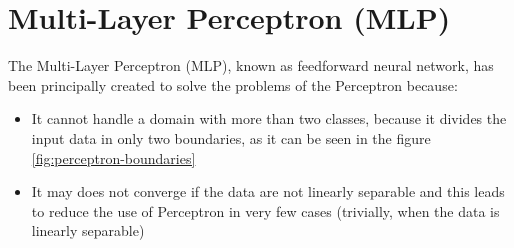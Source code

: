 \section{Multi-Layer Perceptron (MLP)}
The Multi-Layer Perceptron (MLP), known as feedforward neural network, has been principally created to solve the problems of the Perceptron because:
\begin{itemize}
	\item{It cannot handle a domain with more than two classes, because it divides the input data in only two boundaries, as it can be seen in the figure \ref{fig:perceptron-boundaries}}
	\item{It may does not converge if the data are not linearly separable and this leads to reduce the use of Perceptron in very few cases (trivially, when the data is linearly separable)}
\end{itemize}

